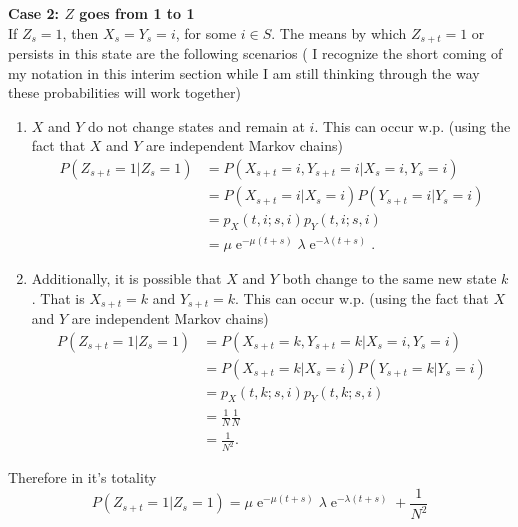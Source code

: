 \documentclass[10pt]{amsart}
\DeclareMathOperator{\E}{e}
\begin{document}
\noindent
\textbf{Case 2: $Z$ goes from 1 to 1} \\
If $Z_s = 1$, then $X_s = Y_s = i$, for some $i \in S$.
The means by which $Z_{s + t} = 1$ or persists in this state are the following scenarios ( I recognize the short coming of my notation in this interim section while I am still thinking through the way these probabilities will work together)
\begin{enumerate}
\item $X$ and $Y$ do not change states and remain at $i$.
This can occur w.p. (using the fact that $X$ and $Y$ are independent Markov chains)
\begin{align*}
P(Z_{s + t} = 1 | Z_s = 1)
	&= P(X_{s + t} = i,Y_{s + t} = i | X_s = i,Y_s = i) \\
	&= P(X_{s + t} = i| X_s = i)P(Y_{s + t} = i | Y_s = i) \\
	&= p_X(t,i;s,i) p_Y(t,i;s,i) \\
	&= \mu\E^{-\mu(t + s)} \lambda\E^{-\lambda(t + s)}.
\end{align*}
\item Additionally, it is possible that $X$ and $Y$ both change to the same new state $k$.
That is $X_{s + t} = k$ and $Y_{s + t} = k$.
This can occur w.p. (using the fact that $X$ and $Y$ are independent Markov chains)
\begin{align*}
P(Z_{s + t} = 1 | Z_s = 1)
	&= P(X_{s + t} = k,Y_{s + t} = k | X_s = i,Y_s = i) \\
	&= P(X_{s + t} = k| X_s = i)P(Y_{s + t} = k | Y_s = i) \\
	&= p_X(t,k;s,i)p_Y(t,k;s,i) \\
	&= \frac 1 N \frac 1 N \\
	&= \frac 1 {N^2}.
\end{align*}
\end{enumerate}
Therefore in it's totality 
$$
P(Z_{s + t} = 1 | Z_s = 1) = \mu\E^{-\mu(t + s)} \lambda\E^{-\lambda(t + s)} + \frac 1 {N^2}
$$
\end{document}
